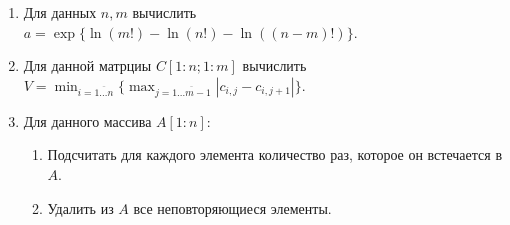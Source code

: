\begin{enumerate}
    \item Для данных \(n, m\) вычислить \(\displaystyle a = \exp\{{\ln(m!) - \ln(n!) - \ln((n - m)!)}\}\). 
    \item Для данной матрциы \(C[1{:}n; 1{:}m]\) вычислить \(\displaystyle V = \min_{i = \overline{1\dots n}}\{\max_{j = \overline{1\dots m - 1}} \left\vert c_{i,j} - c_{i,j+1} \right\vert\}\).
    \item Для данного массива \(A[1{:}n]\):
    \noindent\begin{enumerate}
        \item Подсчитать для каждого элемента количество раз, которое он встечается в \(A\).
        \item Удалить из \(A\) все неповторяющиеся элементы. 
    \end{enumerate}
\end{enumerate}